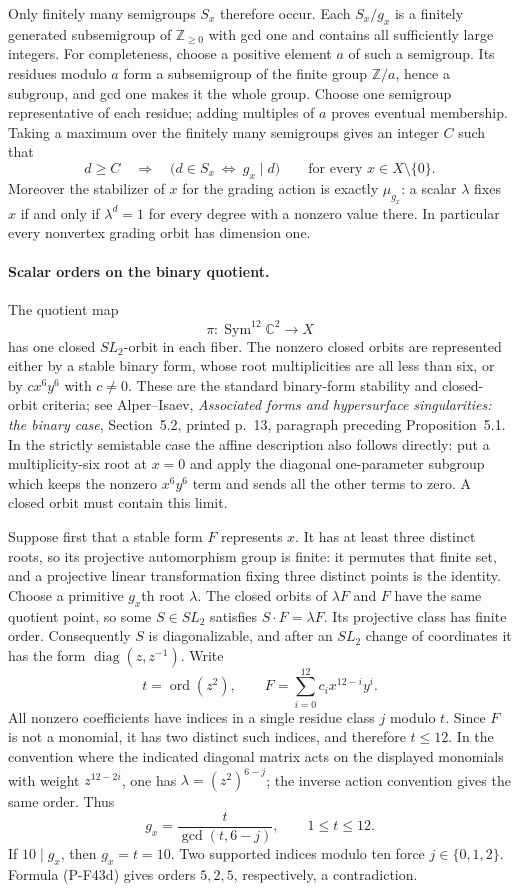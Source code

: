 \documentclass[11pt,a4paper]{article}
\begin{document}
Only finitely many semigroups $S_x$ therefore occur. Each
$S_x/g_x$ is a finitely generated subsemigroup of
$\mathbb Z_{\ge0}$ with gcd one and contains all sufficiently
large integers. For completeness, choose a positive element
$a$ of such a semigroup. Its residues modulo $a$ form a
subsemigroup of the finite group $\mathbb Z/a$, hence a
subgroup, and gcd one makes it the whole group. Choose one
semigroup representative of each residue; adding multiples
of $a$ proves eventual membership. Taking a maximum over
the finitely many semigroups gives an integer $C$ such that
\[
 d\ge C\quad\Longrightarrow\quad
 \bigl(d\in S_x\ \Longleftrightarrow\ g_x\mid d\bigr)
 \qquad\text{for every }x\in X\setminus\{0\}.
 \tag{P-F43c}
\]
Moreover the stabilizer of $x$ for the grading action is
exactly $\mu_{g_x}$: a scalar $\lambda$ fixes $x$ if and only
if $\lambda^d=1$ for every degree with a nonzero value there.
In particular every nonvertex grading orbit has dimension one.

\paragraph{Scalar orders on the binary quotient.}
The quotient map
\[
 \pi:\operatorname{Sym}^{12}\mathbb C^2\longrightarrow X
\]
has one closed $SL_2$-orbit in each fiber. The nonzero closed
orbits are represented either by a stable binary form, whose
root multiplicities are all less than six, or by
$c x^6y^6$ with $c\ne0$. These are the standard binary-form
stability and closed-orbit criteria; see Alper--Isaev,
\emph{Associated forms and hypersurface singularities: the
binary case}, Section~5.2, printed p.~13, paragraph preceding
Proposition~5.1. In the strictly semistable case the affine
description also follows directly: put a multiplicity-six
root at $x=0$ and apply the diagonal one-parameter subgroup
which keeps the nonzero $x^6y^6$ term and sends all the other
terms to zero. A closed orbit must contain this limit.

Suppose first that a stable form $F$ represents $x$. It has
at least three distinct roots, so its projective automorphism
group is finite: it permutes that finite set, and a projective
linear transformation fixing three distinct points is the
identity. Choose a primitive $g_x$th root $\lambda$.
The closed orbits of $\lambda F$ and $F$ have the same
quotient point, so some $S\in SL_2$ satisfies
$S\cdot F=\lambda F$. Its projective class has finite order.
Consequently $S$ is diagonalizable, and after an $SL_2$
change of coordinates it has the form
$\operatorname{diag}(z,z^{-1})$. Write
\[
 t=\operatorname{ord}(z^2),\qquad
 F=\sum_{i=0}^{12}c_i x^{12-i}y^i.
\]
All nonzero coefficients have indices in a single residue
class $j$ modulo $t$. Since $F$ is not a monomial, it has
two distinct such indices, and therefore $t\le12$.
In the convention where the indicated diagonal matrix acts
on the displayed monomials with weight $z^{12-2i}$, one has
$\lambda=(z^2)^{6-j}$; the inverse action convention gives
the same order. Thus
\[
               g_x=\frac{t}{\gcd(t,6-j)},\qquad 1\le t\le12.
 \tag{P-F43d}
\]
If $10\mid g_x$, then $g_x=t=10$. Two supported indices
modulo ten force $j\in\{0,1,2\}$. Formula (P-F43d) gives
orders $5,2,5$, respectively, a contradiction.
\end{document}
